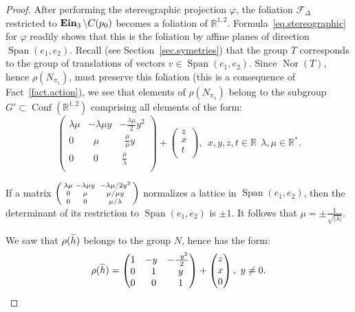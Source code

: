 \documentclass[11pt]{article}
\theoremstyle{definition}
\numberwithin{equation}{section}
\numberwithin{figure}{section}
\numberwithin{table}{section}
\DeclareMathOperator{\Conf}{Conf}
\DeclareMathOperator{\Nor}{Nor}
\DeclareMathOperator{\ein}{{\bf Ein}_3}
\DeclareMathOperator{\Span}{Span}
\newcommand{\calf}{\mathcal{F}}
\newcommand{\tth}{\tilde{h}}
\newcommand*\RR{\mathbb{R}}
\let\oldtilde\tilde
\renewcommand*\tilde[1]{\mathchoice{\widetilde{#1}}{\widetilde{#1}}{\widetilde{#1}}{\oldtilde{#1}}}
\newenvironment{smallpmatrix}{\left(\begin{smallmatrix}}{\end{smallmatrix}\right)}
\newcommand*{\sfrac}[2]{#1/#2}
\begin{document}
\begin{proof}
After performing the stereographic projection $\varphi$, the foliation $\calf_{\Delta}$ restricted to $\ein \setminus C(p_0)$ becomes a foliation of $\RR^{1,2}$. Formula~\eqref{eq.stereographic} for $\varphi$ readily shows that this is the foliation by affine planes of direction $\Span(e_1,e_2)$. Recall (see Section~\ref{sec.symetries}) that the group $T$ corresponds to the group of translations of vectors $v \in \Span(e_1,e_2)$. Since $\Nor(T)$, hence $\rho(N_{\pi_1})$, must preserve this foliation (this is a consequence of Fact~\ref{fact.action}), we see that elements of $\rho(N_{\pi_1})$ belong to the subgroup $G' \subset \Conf(\RR^{1,2})$ comprising all elements of the form:
\begin{equation}\label{eq.formuleG}
\begin{pmatrix}
\lambda \mu&-\lambda \mu y&-\frac{\lambda \mu}{2}y^2\\ 0& \;\;\mu & \;\;\frac{\mu}{\mu}y\\0&\;\;0&\;\frac{\mu}{\lambda}\\
\end{pmatrix} +
\begin{pmatrix} z\\ x\\ t \\
\end{pmatrix}, \ \ x,y,z,t \in \RR \ \ \lambda, \mu \in \RR^*.
\end{equation}

If a matrix $
\begin{smallpmatrix}
\lambda \mu&-\lambda \mu y&\;-\sfrac{\lambda \mu}{2}y^2\\ 0&\mu &\;\sfrac{\mu}{\mu}y\\0&0&\;\sfrac{\mu}{\lambda}\\
\end{smallpmatrix}$ normalizes a lattice in $\Span(e_1,e_2)$, then the determinant of its restriction to $\Span(e_1,e_2)$ is $\pm 1$. It follows that $\mu=\pm \frac{1}{\sqrt{|\lambda|}}$.

We saw that $\rho(\tth)$ belongs to the group $N$, hence has the form:
\[
\rho(\tth)= 
\begin{pmatrix}
1&- y&-\frac{\;\;y^2}{2 }\\ 0&\;\;1 & \;\;y\\0&\;\;0& \;\;1\\
\end{pmatrix} +
\begin{pmatrix}
 z\\ x\\ 0 \\
\end{pmatrix}, \ y \not = 0.
\]


\end{proof}
\end{document}
